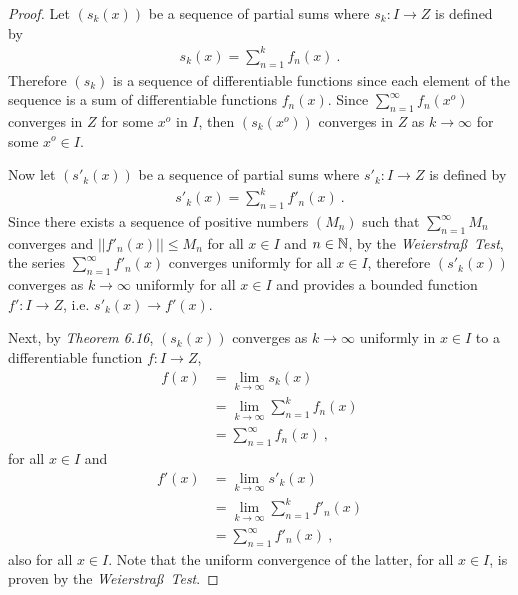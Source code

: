 \begin{questions}


\begin{solution}
  \begin{proof}
Let $(s_k(x))$ be a sequence of partial sums where  $s_k:I\rightarrow Z$ is defined by
\begin{align*}
s_k(x)=\sum_{n=1}^kf_n(x)~.
\end{align*}
Therefore $(s_k)$ is a sequence of differentiable functions since each element of the sequence is a sum of differentiable functions $f_n(x)$. Since $\sum_{n=1}^{\infty}f_n(x^o)$ converges in $Z$ for some $x^o$ in $I$, then $(s_k(x^o))$ converges in $Z$ as $k\rightarrow\infty$ for some $x^o\in I$.

Now let $(s'_k(x))$ be a sequence of partial sums where $s'_k:I\rightarrow Z$ is defined by
\begin{align*}
s'_k(x)=\sum_{n=1}^kf'_n(x)~.
\end{align*}
Since there exists a sequence of positive numbers $(M_n)$ such that $\sum_{n=1}^{\infty}M_n$ converges and $||f'_n(x)||\leq M_n$ for all $x\in I$ and $n\in \mathbb{N}$, by the \textit{Weierstra\ss~Test}, the series $\sum_{n=1}^{\infty}f'_n(x)$ converges uniformly for all $x\in I$, therefore $(s'_k(x))$ converges as $k\rightarrow\infty$ uniformly for all $x\in I$ and provides a bounded function $f':I\rightarrow Z$, i.e. $s'_k(x)\rightarrow f'(x)$.

Next, by \textit{Theorem 6.16}, $(s_k(x))$ converges as $k\rightarrow\infty$ uniformly in $x\in I$ to a differentiable function $f:I\rightarrow Z$, 
\begin{align*}
f(x)&=\lim_{k\rightarrow\infty}s_k(x)\\
&=\lim_{k\rightarrow\infty}\sum_{n=1}^kf_n(x)\\
&=\sum_{n=1}^{\infty}f_n(x)~,
\end{align*}
for all $x\in I$ and 
\begin{align*}
f'(x)&=\lim_{k\rightarrow\infty}s'_k(x)\\
&=\lim_{k\rightarrow\infty}\sum_{n=1}^kf'_n(x)\\
&=\sum_{n=1}^{\infty}f'_n(x)~,
\end{align*}
also for all $x\in I$. Note that the uniform convergence of the latter, for all $x\in I$, is proven by the \textit{Weierstra\ss~Test}.
\end{proof}
\end{solution}
\end{questions}